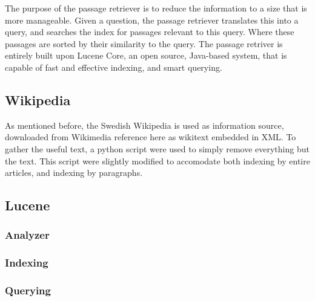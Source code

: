 The purpose of the passage retriever is to reduce the information to a size that is more manageable.
Given a question, the passage retriever translates this into a query, and searches the index for passages 
relevant to this query. Where these passages are sorted by their similarity to the query.
The passage retriver is entirely built upon Lucene Core, an open source, Java-based system, 
that is capable of fast and effective indexing, and smart querying.

\subsection{Wikipedia}
As mentioned before, the Swedish Wikipedia is used as information source, downloaded from Wikimedia {reference here} as wikitext embedded in XML.
To gather the useful text, a python script were used to simply remove everything but the text. 
This script were slightly modified to accomodate both indexing by entire articles, and indexing by paragraphs.

\subsection{Lucene}


\subsubsection{Analyzer}

\subsubsection{Indexing}

\subsubsection{Querying}
